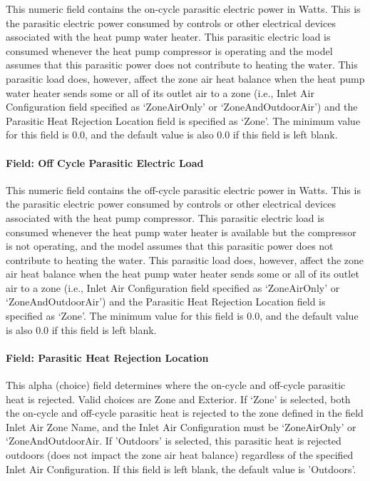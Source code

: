 This numeric field contains the on-cycle parasitic electric power in Watts. This is the parasitic electric power consumed by controls or other electrical devices associated with the heat pump water heater. This parasitic electric load is consumed whenever the heat pump compressor is operating and the model assumes that this parasitic power does not contribute to heating the water. This parasitic load does, however, affect the zone air heat balance when the heat pump water heater sends some or all of its outlet air to a zone (i.e., Inlet Air Configuration field specified as `ZoneAirOnly' or `ZoneAndOutdoorAir') and the Parasitic Heat Rejection Location field is specified as `Zone'. The minimum value for this field is 0.0, and the default value is also 0.0 if this field is left blank.

\paragraph{Field: Off Cycle Parasitic Electric Load}\label{field-off-cycle-parasitic-electric-load-000}

This numeric field contains the off-cycle parasitic electric power in Watts. This is the parasitic electric power consumed by controls or other electrical devices associated with the heat pump compressor. This parasitic electric load is consumed whenever the heat pump water heater is available but the compressor is not operating, and the model assumes that this parasitic power does not contribute to heating the water. This parasitic load does, however, affect the zone air heat balance when the heat pump water heater sends some or all of its outlet air to a zone (i.e., Inlet Air Configuration field specified as `ZoneAirOnly' or `ZoneAndOutdoorAir') and the Parasitic Heat Rejection Location field is specified as `Zone'. The minimum value for this field is 0.0, and the default value is also 0.0 if this field is left blank.

\paragraph{Field: Parasitic Heat Rejection Location}\label{field-parasitic-heat-rejection-location}

This alpha (choice) field determines where the on-cycle and off-cycle parasitic heat is rejected. Valid choices are Zone and Exterior. If `Zone' is selected, both the on-cycle and off-cycle parasitic heat is rejected to the zone defined in the field Inlet Air Zone Name, and the Inlet Air Configuration must be `ZoneAirOnly' or `ZoneAndOutdoorAir. If 'Outdoors' is selected, this parasitic heat is rejected outdoors (does not impact the zone air heat balance) regardless of the specified Inlet Air Configuration. If this field is left blank, the default value is 'Outdoors'.

